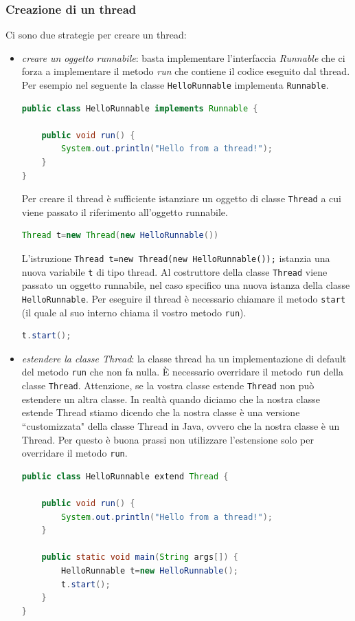 \documentclass{article}
\begin{document}
\subsubsection{Creazione di un thread}
Ci sono due strategie per creare un thread:
\begin{itemize}
\item \emph{creare un oggetto runnabile}: basta implementare l'interfaccia \emph{Runnable} che ci forza a implementare il metodo \emph{run} che contiene il codice eseguito dal thread. Per esempio nel seguente la classe \texttt{HelloRunnable} implementa \texttt{Runnable}.  
\begin{lstlisting}[language=Java]
public class HelloRunnable implements Runnable {

    public void run() {
        System.out.println("Hello from a thread!");
    }
}
\end{lstlisting}
Per creare il thread \`e sufficiente istanziare un oggetto di classe \texttt{Thread} a cui viene passato il riferimento all'oggetto runnabile. 
\begin{lstlisting}[language=Java]
Thread t=new Thread(new HelloRunnable())
\end{lstlisting}
L'istruzione \texttt{Thread t=new Thread(new HelloRunnable());} istanzia una nuova variabile \texttt{t} di tipo thread.
Al costruttore della classe \texttt{Thread} viene passato un oggetto runnabile, nel caso specifico una nuova istanza della classe \texttt{HelloRunnable}. Per eseguire il thread \`e necessario chiamare il metodo \texttt{start} (il quale al suo interno chiama il vostro metodo \texttt{run}).
\begin{lstlisting}[language=Java]
t.start();
\end{lstlisting}

\item \emph{estendere la classe Thread}: la classe thread ha un implementazione di default del metodo \texttt{run} che non fa nulla. \`E necessario overridare il metodo \texttt{run} della classe \texttt{Thread}. Attenzione, se la vostra classe estende \texttt{Thread} non pu\`o estendere un altra classe. In realt\`a quando diciamo che la nostra classe estende Thread stiamo dicendo che la nostra classe \`e una versione ``customizzata" della classe Thread in Java, ovvero che la nostra classe \`e un Thread. Per questo \`e buona prassi non utilizzare l'estensione solo per overridare il metodo \texttt{run}.
\begin{lstlisting}[language=Java]
public class HelloRunnable extend Thread {

    public void run() {
        System.out.println("Hello from a thread!");
    }

    public static void main(String args[]) {
        HelloRunnable t=new HelloRunnable();
        t.start();
    }
}
\end{lstlisting}
\end{itemize}
\end{document}
